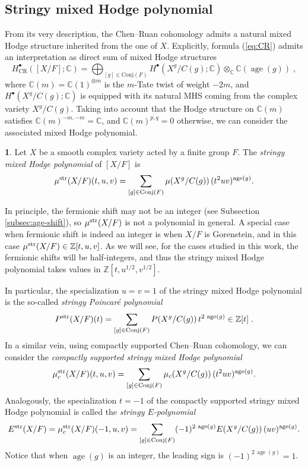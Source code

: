 \documentclass[11pt,english]{amsart}
\numberwithin{equation}{section}
\numberwithin{figure}{section}
\theoremstyle{plain}
\theoremstyle{plain}
\theoremstyle{definition}
\newtheorem{defn}[thm]{\protect\definitionname}
\theoremstyle{remark}
\newcommand{\ZZ}{\mathbb{Z}}
\newcommand{\CC}{\mathbb{C}}
\newcommand{\age}{\operatorname{age}}
\newcommand{\str}{\textup{str}}
\providecommand{\definitionname}{Definition}
\begin{document}
\subsection{Stringy mixed Hodge polynomial}\label{sec:stringy-MH-poly}

From its very description, the Chen--Ruan cohomology admits a natural mixed Hodge structure inherited from the one of $X$. Explicitly, formula (\ref{eq:CR}) admits an interpretation as direct sum of mixed Hodge structures
$$
H^\bullet_{\text{CR}}([X/F]; \mathbb{C}) = \bigoplus_{[g] \in \text{Conj}(F)} H^{\bullet}(X^g / C(g); \mathbb{C}) \otimes_{\CC} \CC(\age(g))\; ,
$$
where $\CC(m) = \CC(1)^{\otimes m}$ is the $m$-Tate twist of weight $-2m$, and $H^{\bullet}(X^g / C(g); \mathbb{C})$ is equipped with its natural MHS coming from the complex variety $X^g/C(g)$. Taking into account that the Hodge structure on $\CC(m)$ satisfies $\CC(m)^{-m,-m} = \CC$, and $\CC(m)^{p,q}=0$
otherwise, we can consider the associated mixed Hodge polynomial.

\begin{defn}
\label{def:str_hodge_pol}
    Let $X$ be a smooth complex variety acted by a finite group $F$. The \emph{stringy mixed Hodge polynomial} of $[X/F]$ is 
$$
    \mu^{\str}(X/F)(t, u, v) = \sum_{[g] \in \text{Conj}(F)} \mu(X^g / C(g))\, (t^{2}uv)^{\age(g)}.
$$
\end{defn}
In principle, the fermionic shift may not be an integer (see Subsection  \ref{subsec:age-shift}), so $\mu^{\str}(X/F)$ is not a polynomial in general. A special case when fermionic shift is indeed an integer is when $X/F$ is Gorenstein, and in this case $\mu^{\str}(X/F) \in \ZZ[t,u,v]$. As we will see, for the cases studied in this work, the fermionic shifts will be half-integers, and thus the stringy mixed Hodge polynomial takes values in $\ZZ[t,u^{1/2},v^{1/2}]$.

In particular, the specialization $u = v = 1$ of the stringy mixed Hodge polynomial is the so-called \emph{stringy Poincar\'e polynomial}
\begin{equation}
    \label{eq:str_Poincare_pol}
    P^{\str}(X/F)(t) = \sum_{[g] \in \text{Conj}(F)} P(X^g / C(g))\, t^{2\,\age(g)} \in \ZZ[t]\; .
\end{equation}
In a similar vein, using compactly supported Chen--Ruan cohomology, we can consider the \emph{compactly supported stringy mixed Hodge polynomial}
\begin{equation}
    \label{eq:str_compact_hodge_pol}
    \mu_c^{\str}(X/F)(t, u, v) = \sum_{[g] \in \text{Conj}(F)} \mu_c(X^g / C(g))\, (t^{2}uv)^{\age(g)}.
\end{equation}
Analogously, the specialization $t = -1$ of the compactly supported stringy mixed Hodge polynomial is called the \emph{stringy $E$-polynomial}
\begin{equation}
    \label{eq:str_e_pol}
    E^\str(X/F) =\mu_c^{\str}(X/F)(-1, u, v) = \sum_{[g] \in \text{Conj}(F)}(-1)^{2\,\age(g)} E(X^g / C(g))\, (uv)^{\age(g)}.
\end{equation}
Notice that when $\age(g)$ is an integer, the leading sign is $(-1)^{2\,\age(g)} = 1$.
\end{document}
